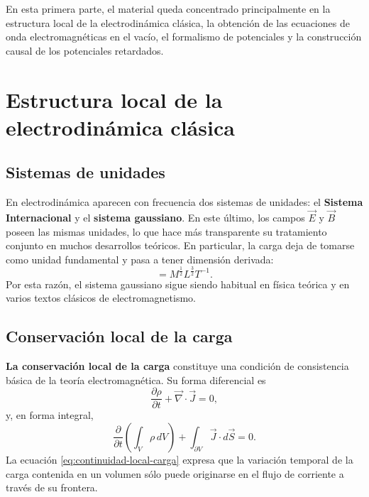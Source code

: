 \documentclass[12pt,a4paper]{article}
\theoremstyle{definition}
\theoremstyle{plain}
\numberwithin{equation}{section}
\theoremstyle{remark}
\begin{document}
En esta primera parte, el material queda concentrado principalmente en la estructura local de la electrodinámica clásica, la obtención de las ecuaciones de onda electromagnéticas en el vacío, el formalismo de potenciales y la construcción causal de los potenciales retardados.

\newpage

\section{Estructura local de la electrodinámica clásica}

\subsection{Sistemas de unidades}

En electrodinámica aparecen con frecuencia dos sistemas de unidades: el \textbf{Sistema Internacional} y el \textbf{sistema gaussiano}. En este último, los campos $\vec E$ y $\vec B$ poseen las mismas unidades, lo que hace más transparente su tratamiento conjunto en muchos desarrollos teóricos. En particular, la carga deja de tomarse como unidad fundamental y pasa a tener dimensión derivada:
\begin{equation*}
    [q]= M^{\frac{1}{2}} L^{\frac{3}{2}}T^{-1}.
\end{equation*}
Por esta razón, el sistema gaussiano sigue siendo habitual en física teórica y en varios textos clásicos de electromagnetismo.


\subsection{Conservación local de la carga}

\textbf{La conservación local de la carga} constituye una condición de consistencia básica de la teoría electromagnética. Su forma diferencial es
\begin{equation}
    \frac{\partial \rho}{\partial t}+\vec\nabla\cdot\vec J = 0,
    \label{eq:continuidad-local-carga}
\end{equation}
y, en forma integral,
\begin{equation*}
    \frac{\partial}{\partial t}\left(\int_V \rho\, dV\right)+\int_{\partial V}\vec J\cdot d\vec S=0.
\end{equation*}
La ecuación \eqref{eq:continuidad-local-carga} expresa que la variación temporal de la carga contenida en un volumen sólo puede originarse en el flujo de corriente a través de su frontera.
\end{document}
